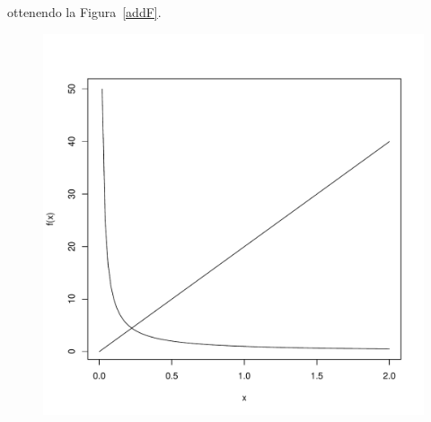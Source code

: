\documentclass[onecolumn,11pt]{book}\usepackage[]{graphicx}\usepackage[]{color}
\makeatletter
\def\maxwidth{ %
  \ifdim\Gin@nat@width>\linewidth
    \linewidth
  \else
    \Gin@nat@width
  \fi
}
\newenvironment{knitrout}{}{} %
\makeatother
\begin{document}
\begin{itemize}
ottenendo la Figura~\ref{addF}.
\begin{figure}[htbp]
\begin{center}
\begin{knitrout}
\color{fgcolor}
\includegraphics[width=\maxwidth]{figure/unnamed-chunk-71-1} 


\end{knitrout}
\end{center}
\end{figure}
\end{itemize}
\end{document}
